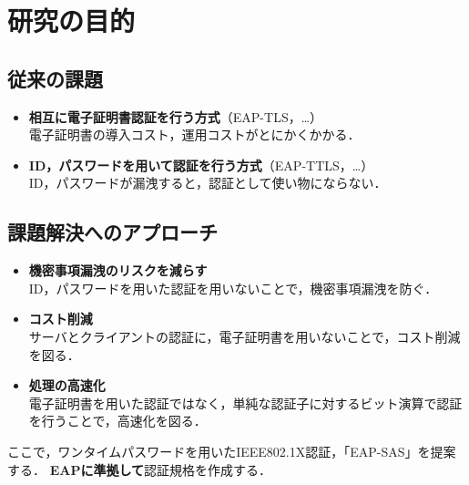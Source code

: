 \section{研究の目的}
\toc
\subsection{従来の課題}
\begin{frame}{\ft}
    \begin{alertblock}{}
        \begin{itemize}
            \setlength{\itemsep}{1em}
            \item \textbf{相互に電子証明書認証を行う方式}（EAP-TLS，\dots）\\\vspace{.5em}
                  電子証明書の導入コスト，運用コストがとにかくかかる．
            \item \textbf{ID，パスワードを用いて認証を行う方式}（EAP-TTLS，\dots）\\\vspace{.5em}
                  ID，パスワードが漏洩すると，認証として使い物にならない．
        \end{itemize}
    \end{alertblock}
\end{frame}
\subsection{課題解決へのアプローチ}
\begin{frame}{\ft}
    \begin{exampleblock}{}
        \begin{itemize}
            \setlength{\itemsep}{1em}
            \item \textbf{機密事項漏洩のリスクを減らす}\\
                  ID，パスワードを用いた認証を用いないことで，機密事項漏洩を防ぐ．
            \item \textbf{コスト削減}\\
                  サーバとクライアントの認証に，電子証明書を用いないことで，コスト削減を図る．
            \item \textbf{処理の高速化}\\
                  電子証明書を用いた認証ではなく，単純な認証子に対するビット演算で認証を行うことで，高速化を図る．
        \end{itemize}
    \end{exampleblock}
    ここで，ワンタイムパスワードを用いたIEEE802.1X認証，「EAP-SAS」を提案する．
    \textbf{\color{red}EAPに準拠して}認証規格を作成する．
\end{frame}